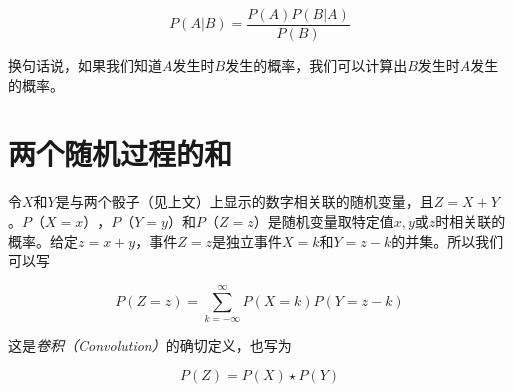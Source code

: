 \begin{equation}
P(A|B)=\frac{P(A)P(B|A)}{P(B)}
\end{equation}


换句话说，如果我们知道$A$发生时$B$发生的概率，我们可以计算出$B$发生时$A$发生的概率。


\section{两个随机过程的和}
\label{sec:convolution}
令$X$和$Y$是与两个骰子（见上文）上显示的数字相关联的随机变量，且$Z=X+Y$。$P（X=x）$，$P（Y=y）$和$P（Z=z）$是随机变量取特定值$x,y$或$z$时相关联的概率。给定$z=x+y$，事件$Z=z$是独立事件$X=k$和$Y=z-k$的并集。所以我们可以写

\begin{equation}
P(Z=z)=\sum_{k=-\infty}^{\infty}P(X=k)P(Y=z-k)
\end{equation}


这是\emph{卷积（Convolution）}的确切定义，也写为

\begin{equation}
P(Z)=P(X)\star P(Y)
\end{equation}



